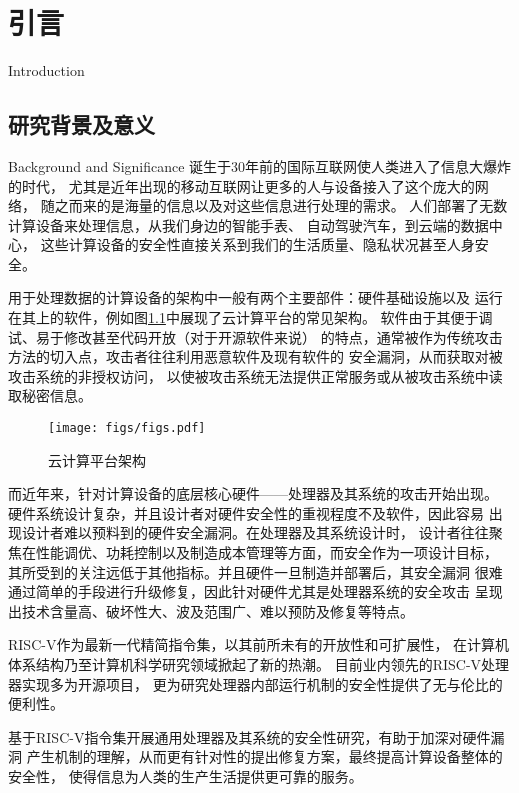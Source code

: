 
\chapter{引言}{Introduction}


\section{研究背景及意义}{Background and Significance}
诞生于30年前的国际互联网使人类进入了信息大爆炸的时代，
尤其是近年出现的移动互联网让更多的人与设备接入了这个庞大的网络，
随之而来的是海量的信息以及对这些信息进行处理的需求。
人们部署了无数计算设备来处理信息，从我们身边的智能手表、
自动驾驶汽车，到云端的数据中心，
这些计算设备的安全性直接关系到我们的生活质量、隐私状况甚至人身安全。

用于处理数据的计算设备的架构中一般有两个主要部件：硬件基础设施以及
运行在其上的软件，例如图\ref{fig:cloud-arch}中展现了云计算平台的常见架构。
软件由于其便于调试、易于修改甚至代码开放（对于开源软件来说）
的特点，通常被作为传统攻击方法的切入点，攻击者往往利用恶意软件及现有软件的
安全漏洞，从而获取对被攻击系统的非授权访问，
以使被攻击系统无法提供正常服务或从被攻击系统中读取秘密信息。\cite{sw_attack}

\begin{figure}[ht]
	\centering
	\texttt{[image: figs/figs.pdf]}
	\caption{云计算平台架构}
	\label{fig:cloud-arch}
\end{figure}

而近年来，针对计算设备的底层核心硬件——处理器及其系统的攻击开始出现。
硬件系统设计复杂，并且设计者对硬件安全性的重视程度不及软件，因此容易
出现设计者难以预料到的硬件安全漏洞。在处理器及其系统设计时，
设计者往往聚焦在性能调优、功耗控制以及制造成本管理等方面，而安全作为一项设计目标，
其所受到的关注远低于其他指标。并且硬件一旦制造并部署后，其安全漏洞
很难通过简单的手段进行升级修复，因此针对硬件尤其是处理器系统的安全攻击
呈现出技术含量高、破坏性大、波及范围广、难以预防及修复等特点。

RISC-V作为最新一代精简指令集，以其前所未有的开放性和可扩展性，
在计算机体系结构乃至计算机科学研究领域掀起了新的热潮。
目前业内领先的RISC-V处理器实现多为开源项目，
更为研究处理器内部运行机制的安全性提供了无与伦比的便利性。

基于RISC-V指令集开展通用处理器及其系统的安全性研究，有助于加深对硬件漏洞
产生机制的理解，从而更有针对性的提出修复方案，最终提高计算设备整体的安全性，
使得信息为人类的生产生活提供更可靠的服务。

